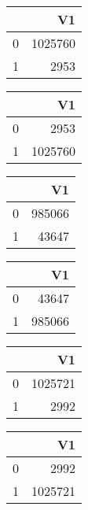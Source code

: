 \bigskip\bigskip
\centering
\begin{tabular}{rr}
  \hline
 & V1 \\ 
  \hline
0 & 1025760 \\ 
  1 & 2953 \\ 
   \hline
\end{tabular}

\bigskip\bigskip
\centering
\begin{tabular}{rr}
  \hline
 & V1 \\ 
  \hline
0 & 2953 \\ 
  1 & 1025760 \\ 
   \hline
\end{tabular}

\bigskip\bigskip
\centering
\begin{tabular}{rr}
  \hline
 & V1 \\ 
  \hline
0 & 985066 \\ 
  1 & 43647 \\ 
   \hline
\end{tabular}

\bigskip\bigskip
\centering
\begin{tabular}{rr}
  \hline
 & V1 \\ 
  \hline
0 & 43647 \\ 
  1 & 985066 \\ 
   \hline
\end{tabular}

\bigskip\bigskip
\centering
\begin{tabular}{rr}
  \hline
 & V1 \\ 
  \hline
0 & 1025721 \\ 
  1 & 2992 \\ 
   \hline
\end{tabular}

\bigskip\bigskip
\centering
\begin{tabular}{rr}
  \hline
 & V1 \\ 
  \hline
0 & 2992 \\ 
  1 & 1025721 \\ 
   \hline
\end{tabular}

